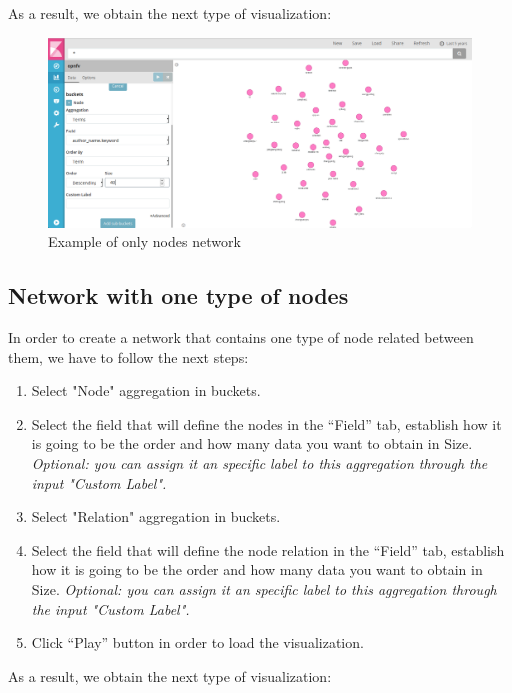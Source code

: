 \documentclass[a4paper, 12pt]{book}
\begin{document}
As a result, we obtain the next type of visualization:

\begin{figure}[H]
  \centering
  \includegraphics[width=16cm, keepaspectratio]{img/results/onlynodes}
  \caption{Example of only nodes network}
  \label{fig:onlynodes}
\end{figure}


\subsection{Network with one type of nodes}

In order to create a network that contains one type of node related between them, we have to follow the next steps:

\begin{enumerate}
\item Select "Node" aggregation in buckets.
\item Select the field that will define the nodes in the “Field” tab, establish how it is going to be the order and how many data you want to obtain in Size. \textit{Optional: you can assign it an specific label to this aggregation through the input "Custom Label". }
\item Select "Relation" aggregation in buckets.
\item Select the field that will define the node relation in the “Field” tab, establish how it is going to be the order and how many data you want to obtain in Size. \textit{Optional: you can assign it an specific label to this aggregation through the input "Custom Label". }
\item Click “Play” button in order to load the visualization.
\end{enumerate}

As a result, we obtain the next type of visualization:
\end{document}
